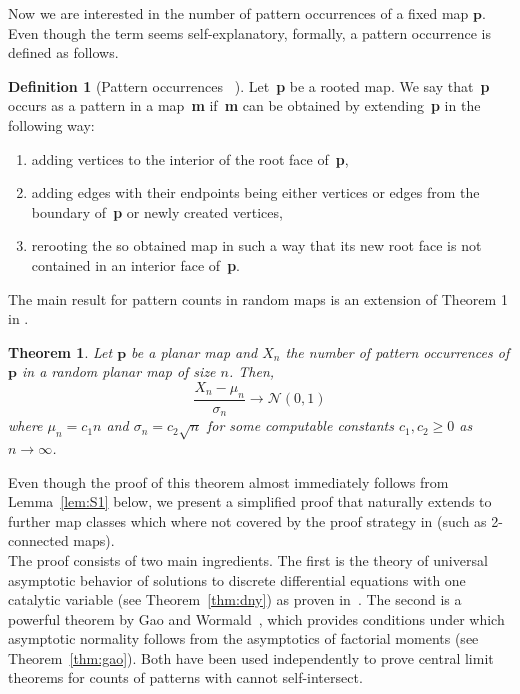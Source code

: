 \documentclass[reqno, 11pt]{amsart}
\newtheorem{theorem}{Theorem}
\theoremstyle{definition}
\newtheorem{definition}{Definition}
\theoremstyle{remark}
\newcommand{\map}[1]{\textbf{#1}}
\numberwithin{equation}{section}
\begin{document}
Now we are interested in the number of pattern occurrences of a fixed map $\map{p}$. Even though the term seems self-explanatory, formally, a pattern occurrence is defined as follows.

\begin{definition}[Pattern occurrences~\cite{BenderGaoRichmond} ]\label{def:submaps}
    Let~\map{p} be a rooted map. We say that~\map{p} occurs as a pattern in a
    map~\map{m} if~\map{m} can be obtained by extending~\map{p} in the following way:
    \begin{enumerate}
        \item[(a)] adding vertices to the interior of the root face of~\map{p},
        \item[(b)] adding edges with their endpoints being either vertices or edges from the
        boundary of~\map{p} or newly created vertices,
        \item[(c)] rerooting the so obtained map in such a way that its new root face is not contained in an interior face of~\map{p}.
    \end{enumerate}
\end{definition}

The main result for pattern counts in random maps is an extension of Theorem 1 in \cite{patternocc}.

\begin{theorem}\label{thm:clt}
    Let $\map{p}$ be a planar map and $X_n$ the number of pattern occurrences of $\map{p}$ in a random planar map of size $n$. Then,
    \[
        \frac{X_n-\mu_n}{\sigma_n} \rightarrow \mathcal{N}(0,1)
    \]
    where $\mu_n = c_1n$ and $\sigma_n = c_2\sqrt{n}$ for some computable constants $c_1,c_2 \geq 0$ as $n\rightarrow \infty$.
\end{theorem}

Even though the proof of this theorem almost immediately follows from Lemma~\ref{lem:S1} below, we present a simplified proof that naturally extends to further map classes which where not covered by the proof strategy in \cite{patternocc} (such as 2-connected maps).\\

The proof consists of two main ingredients. The first is the theory of universal asymptotic behavior of solutions to discrete differential equations with one catalytic variable (see Theorem~\ref{thm:dny}) as proven in~\cite{DrmotaNoyYu}. The second is a powerful theorem by Gao and Wormald~\cite{GaoWormald}, which provides conditions under which asymptotic normality follows from the asymptotics of factorial moments (see Theorem~\ref{thm:gao}). Both have been used independently to prove central limit theorems for counts of patterns with cannot self-intersect.
\end{document}
